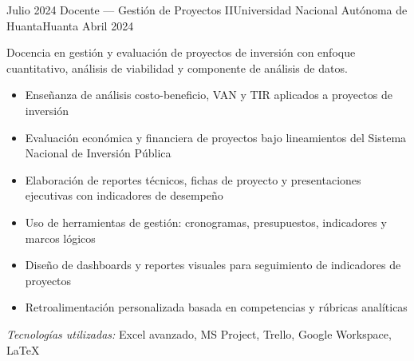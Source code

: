 \experience
{Julio 2024} {Docente — Gestión de Proyectos II}{Universidad Nacional Autónoma de Huanta}{Huanta}
{Abril 2024} {
	Docencia en gestión y evaluación de proyectos de inversión con enfoque cuantitativo, análisis de viabilidad y componente de análisis de datos.
	\begin{itemize}
		\item Enseñanza de análisis costo-beneficio, VAN y TIR aplicados a proyectos de inversión
		\item Evaluación económica y financiera de proyectos bajo lineamientos del Sistema Nacional de Inversión Pública
		\item Elaboración de reportes técnicos, fichas de proyecto y presentaciones ejecutivas con indicadores de desempeño
		\item Uso de herramientas de gestión: cronogramas, presupuestos, indicadores y marcos lógicos
		\item Diseño de dashboards y reportes visuales para seguimiento de indicadores de proyectos
		\item Retroalimentación personalizada basada en competencias y rúbricas analíticas
	\end{itemize}
}
{\footnotesize{\emph{Tecnologías utilizadas:} Excel avanzado, MS Project, Trello, Google Workspace, LaTeX}}
